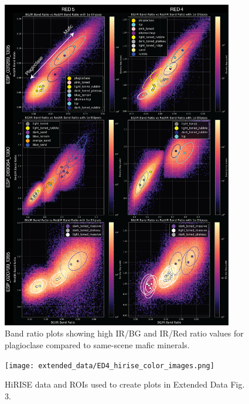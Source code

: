 \documentclass[12pt]{article}
\newenvironment{figurehere}[1][0.85]
  {\begin{figure}[p]
   \begin{minipage}[c][0.80\textheight][c]{\linewidth}
   \centering
   \setlength{\textfloatsep}{0pt}}
  {\end{minipage}
   \end{figure}}
\begin{document}
\begin{figurehere}
    \includegraphics[width=0.9\textwidth]{extended_data/ED3_hirise_color_params.png}
    \caption[Band ratio plots for plagioclase and mafic minerals.]{Band ratio plots showing high IR/BG and IR/Red ratio values for plagioclase compared to same-scene mafic minerals.}
    \label{fig:extended_data_figure3}
\end{figurehere}

\clearpage

\begin{figurehere}
    \texttt{[image: extended\_data/ED4\_hirise\_color\_images.png]}
    \caption[HiRISE data and ROIs used for band ratio plots.]{HiRISE data and ROIs used to create plots in Extended Data Fig. 3.}
    \label{fig:extended_data_figure4}
\end{figurehere}

\clearpage
\end{document}
